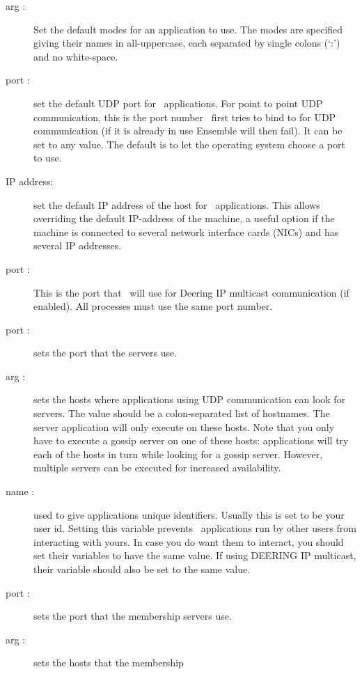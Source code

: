 \begin{description}
\item
[ arg :] Set the default modes for an application to use.  The
modes are specified giving their names in all-uppercase, each separated by
single colons (`:') and no white-space.
\item
[ port :] set the default UDP port for \ensemble\
applications.  For point to point UDP communication, this is the port
number \ensemble\ first tries to bind to for UDP communication (if it
is already in use Ensemble will then fail).  It can be set to any
value.  The default is to let the operating system choose a port to
use.
\item
[ IP address:] set the default IP address of the host for \ensemble\
applications. This allows overriding the default IP-address of the
machine, a useful option if the machine is connected to several
network interface cards (NICs) and has several IP addresses. 
\item
[\mlval{-deering\_port} port :] This is the port that \ensemble\ will
use for Deering IP multicast communication (if enabled).  All
processes must use the same port number.
\item
[ port :] sets the port that the  servers
use.
\item
[ arg :] sets the hosts where applications using UDP
communication can look for  servers.  The value should be a
colon-separated list of hostnames.  The \mlval{gossip} server application will
only execute on these hosts.  Note that you only have to execute a gossip
server on one of these hosts: applications will try each of the hosts in turn
while looking for a gossip server.  However, multiple servers can be executed
for increased availability.
\item
[ name :] used to give applications unique identifiers.
Usually this is set to be your user id.  Setting this variable
prevents \ensemble\ applications run by other users from interacting
with yours.  In case you do want them to interact, you should set
their variables to have the same value.  If using DEERING IP
multicast, their \mlval{-deering\_port} variable should also be set to
the same value.
\item
[ port :] sets the port that the membership 
servers use.
\item
[ arg :] sets the hosts that the membership

\end{description}
